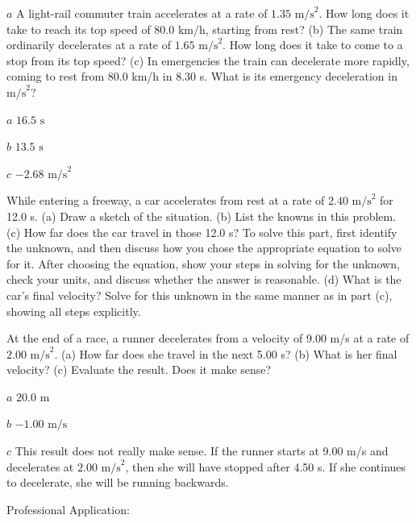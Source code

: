 \documentclass[
]{book}
\begin{document}
\hypertarget{fs-id1164906424347}{}
\leavevmode{}%
\(a\) A light-rail commuter train accelerates at a rate of
\({1\text{.}\text{35\ m/s}^{2}}{}\). How long does it take to reach its
top speed of 80.0 km/h, starting from rest? (b) The same train
ordinarily decelerates at a rate of \({1\text{.}\text{65\ m/s}^{2}}{}\).
How long does it take to come to a stop from its top speed? (c) In
emergencies the train can decelerate more rapidly, coming to rest from
80.0 km/h in 8.30 s. What is its emergency deceleration in
\(\text{m/s}^{2}{}\)?

\leavevmode{}%
\(a\) \({\text{16}\text{.}\text{5\ s}}{}\)

\(b\) \({\text{13}\text{.}\text{5\ s}}{}\)

\(c\) \({{- 2}\text{.}\text{68\ m/s}^{2}}{}\)

\hypertarget{fs-id1164906441407}{}
\leavevmode{}%
While entering a freeway, a car accelerates from rest at a rate of
\({2\text{.}\text{40\ m/s}^{2}}{}\) for 12.0 s. (a) Draw a sketch of the
situation. (b) List the knowns in this problem. (c) How far does the car
travel in those 12.0 s? To solve this part, first identify the unknown,
and then discuss how you chose the appropriate equation to solve for it.
After choosing the equation, show your steps in solving for the unknown,
check your units, and discuss whether the answer is reasonable. (d) What
is the car's final velocity? Solve for this unknown in the same manner
as in part (c), showing all steps explicitly.

\hypertarget{fs-id1164906459799}{}
\leavevmode{}%
At the end of a race, a runner decelerates from a velocity of 9.00 m/s
at a rate of \({2\text{.}\text{00\ m/s}^{2}}{}\). (a) How far does she
travel in the next 5.00 s? (b) What is her final velocity? (c) Evaluate
the result. Does it make sense?

\leavevmode{}%
\(a\) \({\text{20}\text{.}\text{0\ m}}{}\)

\(b\) \({{- 1}\text{.}\text{00\ m/s}}{}\)

\(c\) This result does not really make sense. If the runner starts at
9.00 m/s and decelerates at \({2\text{.}\text{00\ m/s}^{2}}{}\), then she
will have stopped after 4.50 s. If she continues to decelerate, she will
be running backwards.

\hypertarget{fs-id1164906435065}{}
\hypertarget{fs-id1164906435068}{}
{Professional Application:}
\end{document}
